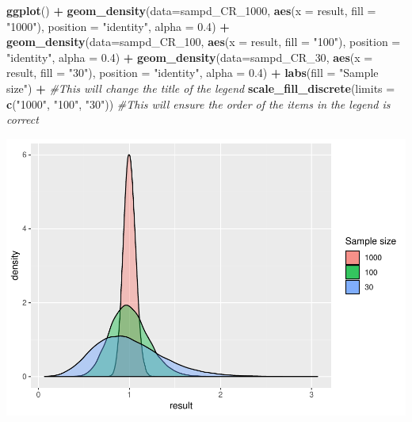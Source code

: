 \documentclass[]{book}
\newenvironment{Shaded}{\begin{snugshade}}{\end{snugshade}}
\newcommand{\CommentTok}[1]{\textcolor[rgb]{0.56,0.35,0.01}{\textit{#1}}}
\newcommand{\DataTypeTok}[1]{\textcolor[rgb]{0.13,0.29,0.53}{#1}}
\newcommand{\DecValTok}[1]{\textcolor[rgb]{0.00,0.00,0.81}{#1}}
\newcommand{\FloatTok}[1]{\textcolor[rgb]{0.00,0.00,0.81}{#1}}
\newcommand{\KeywordTok}[1]{\textcolor[rgb]{0.13,0.29,0.53}{\textbf{#1}}}
\newcommand{\NormalTok}[1]{#1}
\newcommand{\OperatorTok}[1]{\textcolor[rgb]{0.81,0.36,0.00}{\textbf{#1}}}
\newcommand{\StringTok}[1]{\textcolor[rgb]{0.31,0.60,0.02}{#1}}
\theoremstyle{definition}
\theoremstyle{definition}
\theoremstyle{definition}
\theoremstyle{remark}
\begin{document}
\begin{Shaded}
\begin{Highlighting}[]
\KeywordTok{ggplot}\NormalTok{() }\OperatorTok{+}\StringTok{ }
\StringTok{    }\KeywordTok{geom_density}\NormalTok{(}\DataTypeTok{data=}\NormalTok{sampd_CR_}\DecValTok{1000}\NormalTok{, }\KeywordTok{aes}\NormalTok{(}\DataTypeTok{x =}\NormalTok{ result, }\DataTypeTok{fill =} \StringTok{"1000"}\NormalTok{), }\DataTypeTok{position =} \StringTok{"identity"}\NormalTok{, }\DataTypeTok{alpha =} \FloatTok{0.4}\NormalTok{) }\OperatorTok{+}
\StringTok{   }\KeywordTok{geom_density}\NormalTok{(}\DataTypeTok{data=}\NormalTok{sampd_CR_}\DecValTok{100}\NormalTok{, }\KeywordTok{aes}\NormalTok{(}\DataTypeTok{x =}\NormalTok{ result, }\DataTypeTok{fill =} \StringTok{"100"}\NormalTok{), }\DataTypeTok{position =} \StringTok{"identity"}\NormalTok{, }\DataTypeTok{alpha =} \FloatTok{0.4}\NormalTok{) }\OperatorTok{+}
\StringTok{   }\KeywordTok{geom_density}\NormalTok{(}\DataTypeTok{data=}\NormalTok{sampd_CR_}\DecValTok{30}\NormalTok{, }\KeywordTok{aes}\NormalTok{(}\DataTypeTok{x =}\NormalTok{ result, }\DataTypeTok{fill =} \StringTok{"30"}\NormalTok{), }\DataTypeTok{position =} \StringTok{"identity"}\NormalTok{, }\DataTypeTok{alpha =} \FloatTok{0.4}\NormalTok{) }\OperatorTok{+}
\StringTok{  }\KeywordTok{labs}\NormalTok{(}\DataTypeTok{fill =} \StringTok{"Sample size"}\NormalTok{) }\OperatorTok{+}\StringTok{ }\CommentTok{#This will change the title of the legend}
\StringTok{  }\KeywordTok{scale_fill_discrete}\NormalTok{(}\DataTypeTok{limits =} \KeywordTok{c}\NormalTok{(}\StringTok{"1000"}\NormalTok{, }\StringTok{"100"}\NormalTok{, }\StringTok{"30"}\NormalTok{)) }\CommentTok{#This will ensure the order of the items in the legend is correct}
\end{Highlighting}
\end{Shaded}

\includegraphics{05-inference_files/figure-latex/unnamed-chunk-19-1.pdf}
\end{document}

